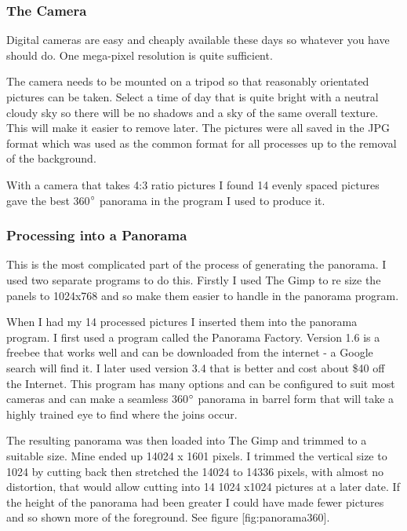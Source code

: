 \subsubsection{The Camera}\label{the-camera}

Digital cameras are easy and cheaply available these days so whatever
you have should do. One mega-pixel resolution is quite sufficient.

The camera needs to be mounted on a tripod so that reasonably orientated
pictures can be taken. Select a time of day that is quite bright with a
neutral cloudy sky so there will be no shadows and a sky of the same
overall texture. This will make it easier to remove later. The pictures
were all saved in the JPG format which was used as the common format for
all processes up to the removal of the background.

With a camera that takes 4:3 ratio pictures I found 14 evenly spaced
pictures gave the best 360$\degree$ panorama in the program I used to produce
it.

\subsubsection{Processing into a
Panorama}\label{processing-into-a-panorama}

This is the most complicated part of the process of generating the
panorama. I used two separate programs to do this. Firstly I used The
Gimp to re size the panels to 1024x768 and so make them easier to handle
in the panorama program.

When I had my 14 processed pictures I inserted them into the panorama
program. I first used a program called the Panorama Factory. Version 1.6
is a freebee that works well and can be downloaded from the internet - a
Google search will find it. I later used version 3.4 that is better and
cost about \$40 off the Internet. This program has many options and can
be configured to suit most cameras and can make a seamless 360$\degree$ panorama
in barrel form that will take a highly trained eye to find where the
joins occur.

The resulting panorama was then loaded into The Gimp and trimmed to a
suitable size. Mine ended up 14024 x 1601 pixels. I trimmed the vertical
size to 1024 by cutting back then stretched the 14024 to 14336 pixels,
with almost no distortion, that would allow cutting into 14 1024 x1024
pictures at a later date. If the height of the panorama had been greater
I could have made fewer pictures and so shown more of the foreground.
See figure {[}fig:panorama360{]}.

